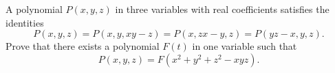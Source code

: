 A polynomial $P(x,y,z)$ in three variables with real coefficients satisfies the identities
\[
P(x,y,z) = P(x,y,xy-z) = P(x,zx-y,z) = P(yz-x,y,z).
\]
Prove that there exists a polynomial $F(t)$ in one variable such that
\[
P(x,y,z) = F(x^2 + y^2 + z^2 - xyz).
\]

